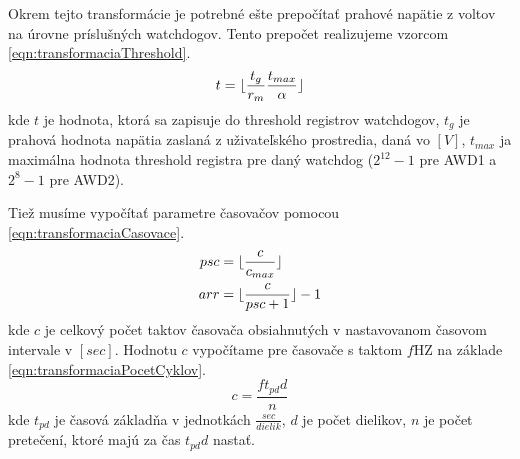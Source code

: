 \documentclass[main.tex]{subfiles}
\begin{document}
	Okrem tejto transformácie je potrebné ešte prepočítať prahové napätie z voltov na úrovne príslušných watchdogov. Tento prepočet realizujeme vzorcom \cref{eqn:transformaciaThreshold}.
	\begin{equation}
	 	t = \lfloor\frac{t_g}{r_m} \frac{t_{max}}{\alpha}\rfloor
	\label{eqn:transformaciaThreshold}
	\end{equation}
	kde $t$ je hodnota, ktorá sa zapisuje do threshold registrov watchdogov, $t_g$ je prahová hodnota napätia zaslaná z uživateľského prostredia, daná vo $[V]$, $t_{max}$ ja maximálna hodnota threshold registra pre daný watchdog ($2^{12}-1$ pre AWD1 a $2^{8}-1$ pre AWD2).
	
	Tiež musíme vypočítať parametre časovačov pomocou \cref{eqn:transformaciaCasovace}.
	\begin{equation}
		\begin{split}
				psc &= \lfloor\frac{c}{c_{max}}\rfloor \\
				arr &= \lfloor\frac{c}{psc + 1}\rfloor-1 \\
		\end{split}
		\label{eqn:transformaciaCasovace}
	\end{equation}
	kde $c$ je celkový počet taktov časovača obsiahnutých v nastavovanom časovom intervale v $[sec]$. Hodnotu $c$ vypočítame pre časovače s taktom $f$HZ na základe \cref{eqn:transformaciaPocetCyklov}.
	\begin{equation}
		c = \frac{f t_{pd} d }{n}
		\label{eqn:transformaciaPocetCyklov}
	\end{equation}
	kde $t_{pd}$ je časová základňa v jednotkách $\frac{sec}{dielik}$, $d$ je počet dielikov, $n$ je počet pretečení, ktoré majú za čas $t_{pd}d$ nastať.
\end{document}
